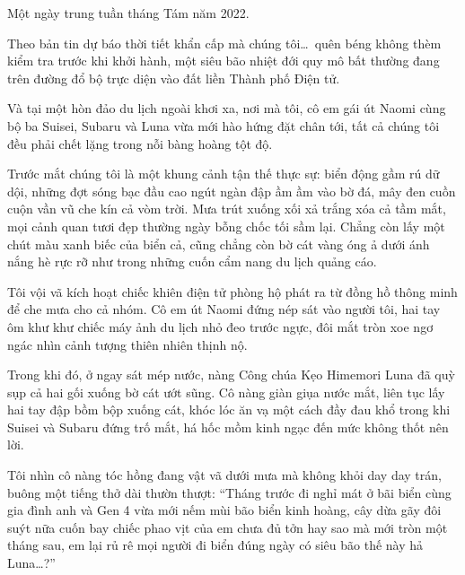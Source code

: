 \documentclass[../main.tex]{subfiles}
\begin{document}


Một ngày trung tuần tháng Tám năm 2022.

Theo bản tin dự báo thời tiết khẩn cấp mà chúng tôi\dots\ quên béng không thèm kiểm tra trước khi khởi hành, một siêu bão nhiệt đới quy mô bất thường đang trên đường đổ bộ trực diện vào đất liền Thành phố Điện tử.

Và tại một hòn đảo du lịch ngoài khơi xa, nơi mà tôi, cô em gái út Naomi cùng bộ ba Suisei, Subaru và Luna vừa mới hào hứng đặt chân tới, tất cả chúng tôi đều phải chết lặng trong nỗi bàng hoàng tột độ.

Trước mắt chúng tôi là một khung cảnh tận thế thực sự: biển động gầm rú dữ dội, những đợt sóng bạc đầu cao ngút ngàn đập ầm ầm vào bờ đá, mây đen cuồn cuộn vần vũ che kín cả vòm trời. Mưa trút xuống xối xả trắng xóa cả tầm mắt, mọi cảnh quan tươi đẹp thường ngày bỗng chốc tối sầm lại. Chẳng còn lấy một chút màu xanh biếc của biển cả, cũng chẳng còn bờ cát vàng óng ả dưới ánh nắng hè rực rỡ như trong những cuốn cẩm nang du lịch quảng cáo.

Tôi vội vã kích hoạt chiếc khiên điện tử phòng hộ phát ra từ đồng hồ thông minh để che mưa cho cả nhóm. Cô em út Naomi đứng nép sát vào người tôi, hai tay ôm khư khư chiếc máy ảnh du lịch nhỏ đeo trước ngực, đôi mắt tròn xoe ngơ ngác nhìn cảnh tượng thiên nhiên thịnh nộ.

Trong khi đó, ở ngay sát mép nước, nàng Công chúa Kẹo Himemori Luna đã quỳ sụp cả hai gối xuống bờ cát ướt sũng. Cô nàng giàn giụa nước mắt, liên tục lấy hai tay đập bồm bộp xuống cát, khóc lóc ăn vạ một cách đầy đau khổ trong khi Suisei và Subaru đứng trố mắt, há hốc mồm kinh ngạc đến mức không thốt nên lời.


Tôi nhìn cô nàng tóc hồng đang vật vã dưới mưa mà không khỏi day day trán, buông một tiếng thở dài thườn thượt: ``Tháng trước đi nghỉ mát ở bãi biển cùng gia đình anh và Gen 4 vừa mới nếm mùi bão biển kinh hoàng, cây dừa gãy đôi suýt nữa cuốn bay chiếc phao vịt của em chưa đủ tởn hay sao mà mới tròn một tháng sau, em lại rủ rê mọi người đi biển đúng ngày có siêu bão thế này hả Luna\dots?''
\end{document}
